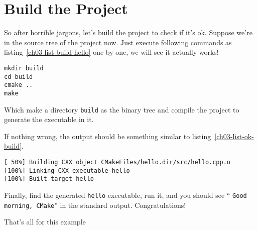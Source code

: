 \documentclass[a4paper,10pt]{book}
\newcommand{\mkeyword}[1]{{\color{magenta} \lstinline!#1!}}
\begin{document}
\section{Build the Project}
So after horrible jargons, let's build the project to check if it's ok. Suppose we're in the source tree of the project now. Just execute following commands as listing~\ref{ch03-list-build-hello} one by one, we will see it actually works!
\begin{lstlisting}[caption={Command to build the project},label=ch03-list-build-hello]
mkdir build
cd build
cmake ..
make
\end{lstlisting}
Which make a directory \texttt{build} as the binary tree and compile the project to generate the executable in it.\par
If nothing wrong, the output should be something similar to listing~\ref{ch03-list-ok-build}. 
\begin{lstlisting}[caption={Successful build},label=ch03-list-ok-build]
[ 50%] Building CXX object CMakeFiles/hello.dir/src/hello.cpp.o
[100%] Linking CXX executable hello
[100%] Built target hello
\end{lstlisting}
Finally, find the generated \mkeyword{hello} executable, run it, and you should see ``\mkeyword{Good morning, CMake}'' in the standard output. Congratulations! \par
That's all for this example~
\end{document}
